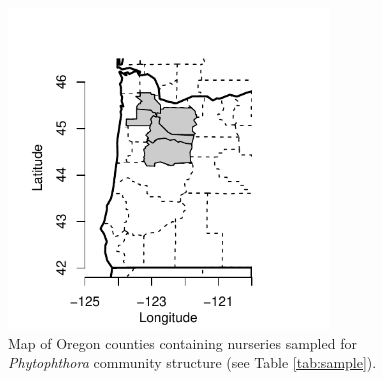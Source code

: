 \documentclass[12pt]{article}
\begin{document}
\begin{figure}[!ht]
\begin{center}
\includegraphics[width=85mm, height=85mm]{nursmap.pdf}
\end{center}
\caption{
Map of Oregon counties containing nurseries sampled for \emph{Phytophthora} community structure (see Table \ref{tab:sample}).
}
\label{fig:map}
\end{figure}
\clearpage
\end{document}
